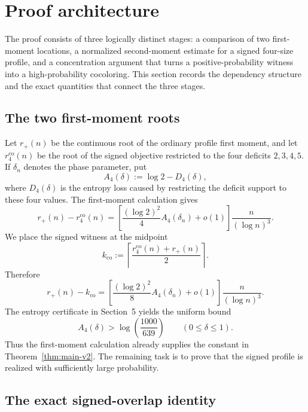
\section{Proof architecture}\label{sec:proof-architecture}

The proof consists of three logically distinct stages: a comparison of two
first-moment locations, a normalized second-moment estimate for a signed
four-size profile, and a concentration argument that turns a
positive-probability witness into a high-probability cocoloring.  This section
records the dependency structure and the exact quantities that connect the
three stages.

\subsection{The two first-moment roots}

Let $r_+(n)$ be the continuous root of the ordinary profile first moment, and
let $r_4^{\mathrm{co}}(n)$ be the root of the signed objective restricted to
the four deficits $2,3,4,5$.  If $\delta_n$ denotes the phase parameter, put
\[
  A_4(\delta):=\log 2-D_4(\delta),
\]
where $D_4(\delta)$ is the entropy loss caused by restricting the deficit
support to these four values.  The first-moment calculation gives
\[
  r_+(n)-r_4^{\mathrm{co}}(n)
  =
  \left[
    \frac{(\log 2)^2}{4}A_4(\delta_n)+o(1)
  \right]
  \frac{n}{(\log n)^3}.
\]
We place the signed witness at the midpoint
\[
  k_{\mathrm{co}}
  :=
  \left\lceil
    \frac{r_4^{\mathrm{co}}(n)+r_+(n)}{2}
  \right\rceil.
\]
Therefore
\[
  r_+(n)-k_{\mathrm{co}}
  =
  \left[
    \frac{(\log 2)^2}{8}A_4(\delta_n)+o(1)
  \right]
  \frac{n}{(\log n)^3}.
\]
The entropy certificate in Section~5 yields the uniform bound
\[
  A_4(\delta)>
  \log\!\left(\frac{1000}{639}\right)
  \qquad (0\le \delta\le 1).
\]
Thus the first-moment calculation already supplies the constant in
Theorem~\ref{thm:main-v2}.  The remaining task is to prove that the signed
profile is realized with sufficiently large probability.

\subsection{The exact signed-overlap identity}

